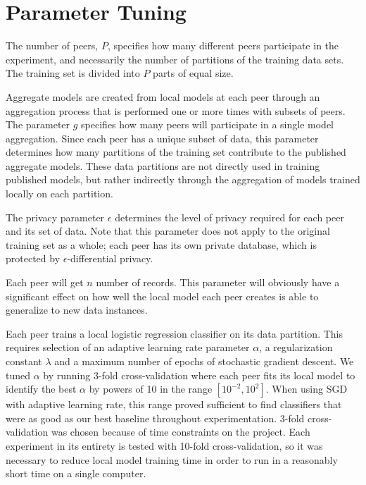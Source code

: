\section{Parameter Tuning}
\label{sec:parameter_tuning}
The number of peers, $P$, specifies how many different peers participate in the experiment, and necessarily the number of partitions of the training data sets. The training set is divided into $P$ parts of equal size.

Aggregate models are created from local models at each peer through an aggregation process that is performed one or more times with subsets of peers. The parameter $g$ specifies how many peers will participate in a single model aggregation. Since each peer has a unique subset of data, this parameter determines how many partitions of the training set contribute to the published aggregate models. These data partitions are not directly used in training published models, but rather indirectly through the aggregation of models trained locally on each partition.

The privacy parameter $\epsilon$ determines the level of privacy required for each peer and its set of data. Note that this parameter does not apply to the original training set as a whole; each peer has its own private database, which is protected by $\epsilon$-differential privacy. 

Each peer will get $n$ number of records. This parameter will obviously have a significant effect on how well the local model each peer creates is able to generalize to new data instances. 

Each peer trains a local logistic regression classifier on its data partition. This requires selection of an adaptive learning rate parameter $\alpha$, a regularization constant $\lambda$ and a maximum number of epochs of stochastic gradient descent. We tuned $\alpha$ by running 3-fold cross-validation where each peer fits its local model to identify the best $\alpha$ by powers of 10 in the range $[10^{-2}, 10^{2}]$. When using SGD with adaptive learning rate, this range proved sufficient to find classifiers that were as good as our best baseline throughout experimentation. 3-fold cross-validation was chosen because of time constraints on the project. Each experiment in its entirety is tested with 10-fold cross-validation, so it was necessary to reduce local model training time in order to run in a reasonably short time on a single computer.

